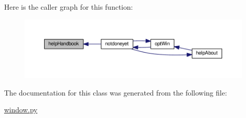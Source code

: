 Here is the caller graph for this function\+:
\nopagebreak
\begin{figure}[H]
\begin{center}
\leavevmode
\includegraphics[width=350pt]{classgui_1_1window_1_1MainWindow_adf2bcf83729f963606d64edf1f739c03_icgraph}
\end{center}
\end{figure}




The documentation for this class was generated from the following file\+:\begin{DoxyCompactItemize}
\item 
\hyperlink{window_8py}{window.\+py}\end{DoxyCompactItemize}
